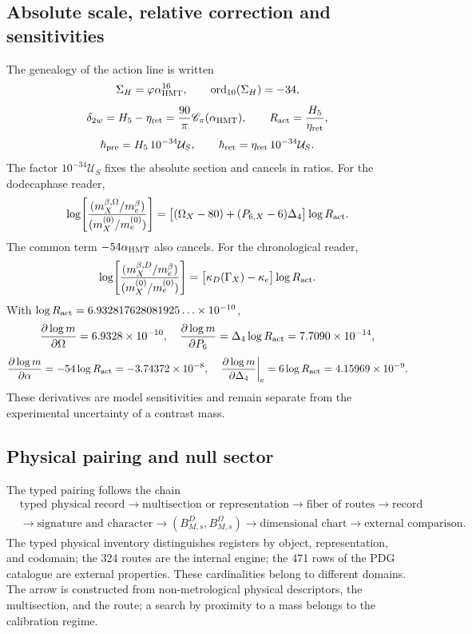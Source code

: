 \subsection{Absolute scale, relative correction and sensitivities}

The genealogy of the action line is written
\[
 \Sigma_H=\varphi\alpha_{\rm HMT}^{16},
 \qquad \operatorname{ord}_{10}(\Sigma_H)=-34,
\]
\[
 \delta_{2w}=H_5-\eta_{\rm ret}
 =\frac{90}{\pi}\mathscr C_\pi(\alpha_{\rm HMT}),
 \qquad R_{\rm act}=\frac{H_5}{\eta_{\rm ret}},
\]
\[
 \hbar_{\rm pre}=H_5\,10^{-34}\mathcal U_S,
 \qquad
 \hbar_{\rm ret}=\eta_{\rm ret}\,10^{-34}\mathcal U_S.
\]
The factor \(10^{-34}\mathcal U_S\) fixes the absolute section and cancels in
ratios. For the dodecaphase reader,
\begin{equation}
 \log\!\left[
 \frac{(m_X^{\beta,\Omega}/m_e^{\beta})}
 {(m_X^{(0)}/m_e^{(0)})}\right]
 =\bigl[(\Omega_X-80)+(P_{6,X}-6)\Delta_4\bigr]
 \log R_{\rm act}.
 \label{eq:razon-masa-omega-rev11}
\end{equation}
The common term \(-54\alpha_{\rm HMT}\) also cancels. For the chronological
reader,
\begin{equation}
 \log\!\left[
 \frac{(m_X^{\beta,D}/m_e^{\beta})}
 {(m_X^{(0)}/m_e^{(0)})}\right]
 =\bigl[\kappa_D(\Gamma_X)-\kappa_e\bigr]\log R_{\rm act}.
 \label{eq:razon-masa-D-rev11}
\end{equation}
With \(\log R_{\rm act}=6.932817628081925\ldots\times10^{-10}\),
\[
 \frac{\partial\log m}{\partial\Omega}=6.9328\times10^{-10},
 \quad
 \frac{\partial\log m}{\partial P_6}
 =\Delta_4\log R_{\rm act}=7.7090\times10^{-14},
\]
\[
 \frac{\partial\log m}{\partial\alpha}
 =-54\log R_{\rm act}=-3.74372\times10^{-8},
 \quad
 \left.\frac{\partial\log m}{\partial\Delta_4}\right|_e
 =6\log R_{\rm act}=4.15969\times10^{-9}.
\]
These derivatives are model sensitivities and remain separate from the
experimental uncertainty of a contrast mass.

\subsection{Physical pairing and null sector}

The typed pairing follows the chain
\[
 \begin{aligned}
 &\text{typed physical record}
 \longrightarrow\text{multisection or representation}
 \longrightarrow\text{fiber of routes}\longrightarrow\text{record}\\
 &\longrightarrow\text{signature and character}
 \longrightarrow(B_{M,s}^D,B_{M,s}^\Omega)
 \longrightarrow\text{dimensional chart}
 \longrightarrow\text{external comparison}.
 \end{aligned}
\]
The typed physical inventory distinguishes registers by object, representation, and codomain; the 324 routes are the internal engine; the 471 rows of the PDG catalogue are external properties. These cardinalities belong to different domains. The arrow is constructed from non-metrological physical descriptors, the multisection, and the route; a search by proximity to a mass belongs to the calibration regime.

